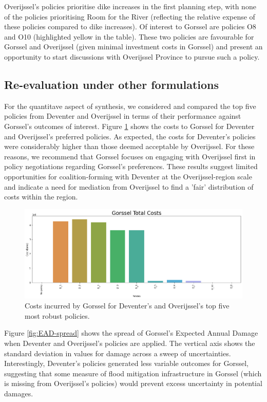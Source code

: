 \noindent Overijssel's policies prioritise dike increases in the first planning step, with none of the policies prioritising Room for the River (reflecting the relative expense of these policies compared to dike increases). Of interest to Gorssel are policies O8 and O10 (highlighted yellow in the table). These two policies are favourable for Gorssel and Overijssel (given minimal investment costs in Gorssel) and present an opportunity to start discussions with Overijssel Province to pursue such a policy.

\subsection{Re-evaluation under other formulations}
For the quantitave aspect of synthesis, we considered and compared the top five policies from Deventer and Overijssel in terms of their performance against Gorssel's outcomes of interest. Figure \ref{fig:cost-pol-g} shows the costs to Gorssel for Deventer and Overijssel's preferred policies. As expected, the costs for Deventer's policies were considerably higher than those deemed acceptable by Overijssel. For these reasons, we recommend that Gorssel focuses on engaging with Overijssel first in policy negotiations regarding Gorssel's preferences. These results suggest limited opportunities for coalition-forming with Deventer at the Overijssel-region scale and indicate a need for mediation from Overijssel to find a 'fair' distribution of costs within the region.

\begin{figure}[h!]
    \centering
    \includegraphics[width=\textwidth]{report/figures/results/spreads/cost_policies_Gorssel.png}
    \caption{Costs incurred by Gorssel for Deventer's and Overijssel's top five most robust policies.}
    \label{fig:cost-pol-g}
\end{figure}

Figure \ref{fig:EAD-spread} shows the spread of Gorssel's Expected Annual Damage when Deventer and Overijssel's policies are applied. The vertical axis shows the standard deviation in values for damage across a sweep of uncertainties. Interestingly, Deventer's policies generated less variable outcomes for Gorssel, suggesting that some measure of flood mitigation infrastructure in Gorssel (which is missing from Overijssel's policies) would prevent excess uncertainty in potential damages.

